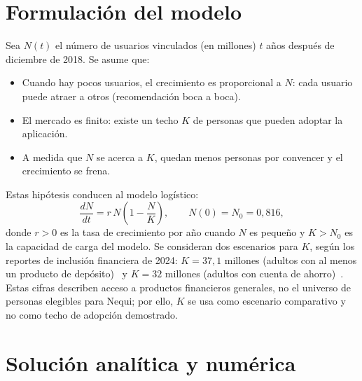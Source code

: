 \documentclass[12pt,a4paper]{article}
\begin{document}
\par

\section{Formulaci\'on del modelo}

Sea $N(t)$ el n\'umero de usuarios vinculados (en millones) $t$ a\~nos despu\'es de diciembre de 2018. Se asume que:
\begin{itemize}
  \item Cuando hay pocos usuarios, el crecimiento es proporcional a $N$: cada usuario puede atraer a otros (recomendaci\'on boca a boca).
  \item El mercado es finito: existe un techo $K$ de personas que pueden adoptar la aplicaci\'on.
  \item A medida que $N$ se acerca a $K$, quedan menos personas por convencer y el crecimiento se frena.
\end{itemize}

Estas hip\'otesis conducen al modelo log\'istico:
\begin{equation}
  \frac{dN}{dt} = r\,N\left(1-\frac{N}{K}\right), \qquad N(0)=N_0=0{,}816,
  \label{eq:logistica}
\end{equation}
donde $r>0$ es la tasa de crecimiento por a\~no cuando $N$ es peque\~no y $K>N_0$ es la capacidad de carga del modelo. Se consideran dos escenarios para $K$, seg\'un los reportes de inclusi\'on financiera de 2024: $K=37{,}1$ millones (adultos con al menos un producto de dep\'osito)~\cite{bdo2024} y $K=32$ millones (adultos con cuenta de ahorro)~\cite{larepublica2024}. Estas cifras describen acceso a productos financieros generales, no el universo de personas elegibles para Nequi; por ello, $K$ se usa como escenario comparativo y no como techo de adopci\'on demostrado.

\section{Soluci\'on anal\'itica y num\'erica}
\end{document}

